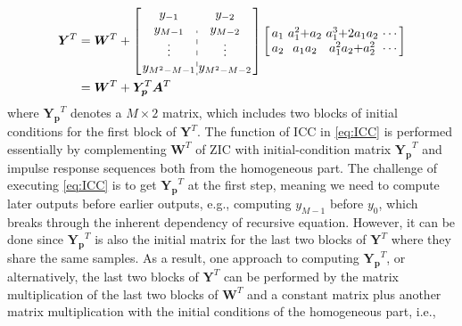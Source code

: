 \begin{equation}
    \label{eq:ICC}
    \begin{aligned}
        \bm{Y}^T &= \bm{W}^T + \left[\arraycolsep=1.0pt\def\arraystretch{1.0}
                \begin{array}{c:c}
                y_{-1} & y_{-2} \\ 
                y_{M-1} & y_{M-2} \\
                \vdots & \vdots \\
                y_{M^2-M-1} & y_{M^2-M-2}
                \end{array}\right]  
                \left[\arraycolsep=1.6pt\def\arraystretch{1.0}
                    \begin{array}{cccc}
                    a_1 & a_1^2{+}a_2 & a_1^3{+}2a_1a_2 & \cdots \\ 
                    a_2 & a_1a_2 & a_1^2a_2{+}a_2^2 & \cdots \\
                    \end{array}\right] \\
        & = \bm{W}^T + \bm{Y_p}^T  \bm{A}^T
    \end{aligned}
\end{equation}
where $\bm{Y_p}^T$ denotes a $M \times 2$ matrix, which includes two blocks of initial conditions for the first block of $\bm{Y}^T$.
The function of ICC in \eqref{eq:ICC} is performed essentially by complementing 
$\bm{W}^T$ of ZIC with initial-condition matrix $\bm{Y_p}^T$ and impulse response sequences both from the homogeneous part.
The challenge of executing \eqref{eq:ICC} is to get $\bm{Y_p}^T$ at the first step,
meaning we need to compute later outputs before earlier outputs,
e.g., computing $y_{M-1}$ before $y_0$, which breaks through the inherent dependency of recursive equation.
However, it can be done since $\bm{Y_p}^T$ is also the initial matrix 
for the last two blocks of $\bm{Y}^T$ where they share the same samples.
As a result, one approach to computing $\bm{Y_p}^T$, or alternatively, the last two blocks of $\bm{Y}^T$
can be performed by the matrix multiplication of the last two blocks of
$\bm{W}^T$ and a constant matrix plus another matrix multiplication with the initial conditions of the homogeneous part, i.e.,

